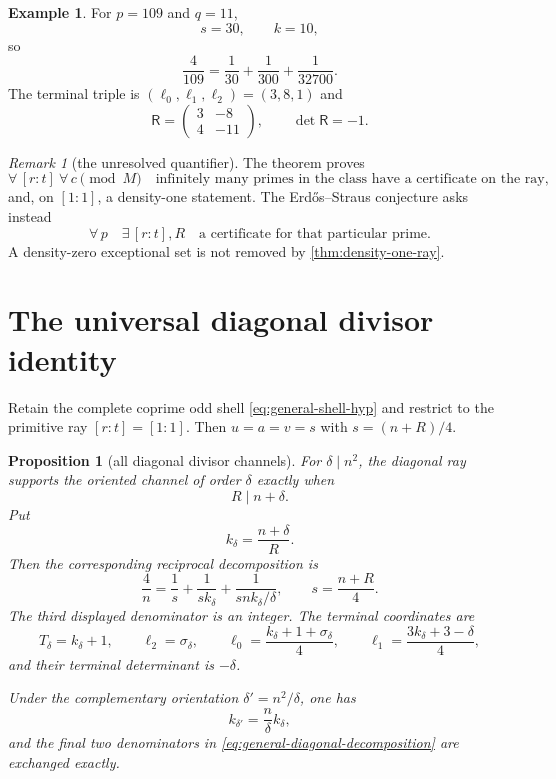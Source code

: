 \documentclass[11pt]{article}
\newtheorem{proposition}[theorem]{Proposition}
\theoremstyle{definition}
\newtheorem{example}[theorem]{Example}
\theoremstyle{remark}
\newtheorem{remark}[theorem]{Remark}
\newcommand{\1}{\mathbf 1}
\newcommand{\mat}[4]{\begin{pmatrix}#1&#2\\#3&#4\end{pmatrix}}
\begin{document}
\begin{example}
For $p=109$ and $q=11$,
\[
 s=30,\qquad k=10,
\]
so
\begin{equation}\label{eq:p109}
 \frac4{109}=\frac1{30}+\frac1{300}+\frac1{32700}.
\end{equation}
The terminal triple is $(\ell_0,\ell_1,\ell_2)=(3,8,1)$ and
\[
 \mathsf R=\mat{3}{-8}{4}{-11},\qquad \det\mathsf R=-1.
\]
\end{example}

\begin{remark}[the unresolved quantifier]
The theorem proves
\[
 \forall\,[r:t]\ \forall\,c\pmod M\quad
 \text{infinitely many primes in the class have a certificate on the ray},
\]
and, on $[1:1]$, a density-one statement.  The Erdős--Straus conjecture asks
instead
\[
 \forall\,p\quad\exists\,[r:t],R\quad\text{a certificate for that particular
 prime}.
\]
A density-zero exceptional set is not removed by \cref{thm:density-one-ray}.
\end{remark}



\section{The universal diagonal divisor identity}

Retain the complete coprime odd shell \eqref{eq:general-shell-hyp} and restrict
to the primitive ray $[r:t]=[1:1]$.  Then $u=a=v=s$ with
$s=(n+R)/4$.

\begin{proposition}[all diagonal divisor channels]
\label{prop:all-diagonal-channels}
For $\delta\mid n^2$, the diagonal ray supports the oriented channel of order
$\delta$ exactly when
\begin{equation}\label{eq:general-diagonal-incidence}
 R\mid n+\delta.
\end{equation}
Put
\begin{equation}\label{eq:general-diagonal-k}
 k_\delta=\frac{n+\delta}{R}.
\end{equation}
Then the corresponding reciprocal decomposition is
\begin{equation}\label{eq:general-diagonal-decomposition}
 \boxed{
 \frac4n
 =\frac1s+\frac1{s k_\delta}
  +\frac1{s n k_\delta/\delta},
 \qquad s=\frac{n+R}{4}.}
\end{equation}
The third displayed denominator is an integer.  The terminal coordinates are
\begin{equation}\label{eq:general-diagonal-terminal}
 T_\delta=k_\delta+1,
 \qquad
 \ell_2=\sigma_\delta,
 \qquad
 \ell_0=\frac{k_\delta+1+\sigma_\delta}{4},
 \qquad
 \ell_1=\frac{3k_\delta+3-\delta}{4},
\end{equation}
and their terminal determinant is $-\delta$.

Under the complementary orientation
$\delta'=n^2/\delta$, one has
\begin{equation}\label{eq:general-diagonal-complement-k}
 k_{\delta'}=\frac n\delta k_\delta,
\end{equation}
and the final two denominators in
\eqref{eq:general-diagonal-decomposition} are exchanged exactly.
\end{proposition}
\end{document}
